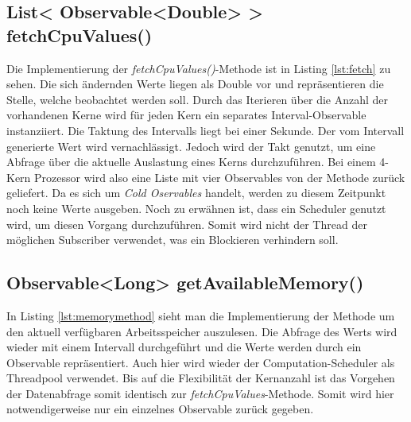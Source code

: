 \subsection{List< Observable<Double> > fetchCpuValues()}
 
Die Implementierung der \textit{fetchCpuValues()}-Methode ist in Listing \ref{lst:fetch} zu sehen. Die sich ändernden Werte liegen als Double vor und repräsentieren die Stelle, welche beobachtet werden soll. Durch das Iterieren über die Anzahl der vorhandenen Kerne wird für jeden Kern ein separates Interval-Observable instanziiert. Die Taktung des Intervalls liegt bei einer Sekunde. Der vom Intervall generierte Wert wird vernachlässigt. Jedoch wird der Takt genutzt, um eine Abfrage über die aktuelle Auslastung eines Kerns durchzuführen. Bei einem 4-Kern Prozessor wird also eine Liste mit vier Observables von der Methode zurück geliefert. Da es sich um \textit{Cold Oservables} handelt, werden zu diesem Zeitpunkt noch keine Werte ausgeben. Noch zu erwähnen ist, dass ein Scheduler genutzt wird, um diesen Vorgang durchzuführen. Somit wird nicht der Thread der möglichen Subscriber verwendet, was ein Blockieren verhindern soll. 
\subsection{Observable<Long> getAvailableMemory()}
In Listing \ref{lst:memorymethod} sieht man die Implementierung der Methode um den aktuell verfügbaren Arbeitsspeicher auszulesen. Die Abfrage des Werts wird wieder mit einem Intervall durchgeführt und die Werte werden durch ein Observable repräsentiert. Auch hier wird wieder der Computation-Scheduler als Threadpool verwendet. Bis auf die Flexibilität der Kernanzahl ist das Vorgehen der Datenabfrage somit identisch zur \textit{fetchCpuValues}-Methode. Somit wird hier notwendigerweise nur ein einzelnes Observable zurück gegeben.
 \newpage
